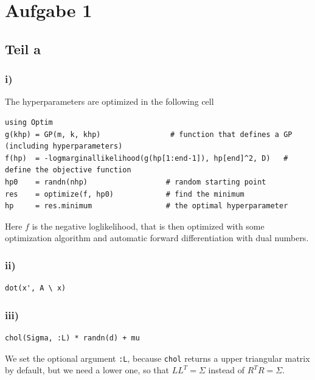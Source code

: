 \documentclass[10pt,a4paper]{article}
\begin{document}
\section{Aufgabe 1}

\subsection{Teil a}

\subsubsection{i)}

The hyperparameters are optimized in the following cell
\begin{verbatim}
using Optim
g(khp) = GP(m, k, khp)                # function that defines a GP (including hyperparameters)
f(hp)  = -logmarginallikelihood(g(hp[1:end-1]), hp[end]^2, D)   # define the objective function
hp0    = randn(nhp)                  # random starting point
res    = optimize(f, hp0)            # find the minimum
hp     = res.minimum                 # the optimal hyperparameter
\end{verbatim}
Here $f$ is the negative loglikelihood, that is then optimized with some
optimization algorithm and automatic forward differentiation with dual numbers.

\subsubsection{ii)}

\begin{verbatim}
dot(x', A \ x)
\end{verbatim}

\subsubsection{iii)}

\begin{verbatim}
chol(Sigma, :L) * randn(d) + mu
\end{verbatim}
We set the optional argument \texttt{:L}, because
\texttt{chol} returns a upper triangular matrix by default, but we
need a lower one, so that $LL^T = \Sigma$ instead of $R^TR = \Sigma$.
\end{document}

